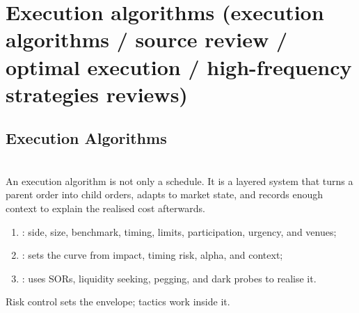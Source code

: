 \documentclass[a4paper,oneside,openany]{book}
\begin{document}
\section*{Execution algorithms (execution algorithms / source review / optimal execution / high-frequency strategies reviews)}

\subsection*{Execution Algorithms}

\begin{principle} \\
An execution algorithm is not only a schedule. It is a layered system that turns a parent order into child orders, adapts to market state, and records enough context to explain the realised cost afterwards.
\end{principle}

\begin{taxonomy} 
\begin{enumerate}[label=\roman*.]
\setlength{\itemsep}{0pt}
\item {}: side, size, benchmark, timing, limits, participation, urgency, and venues;
\item {}: sets the curve from impact, timing risk, alpha, and context;
\item {}: uses SORs, liquidity seeking, pegging, and dark probes to realise it.
\end{enumerate}
Risk control sets the envelope; tactics work inside it.
\end{taxonomy}
\end{document}
